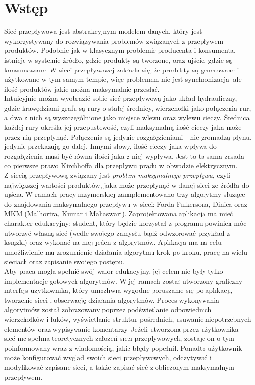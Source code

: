 \chapter{Wstęp}
Sieć przepływowa jest abstrakcyjnym modelem danych, który jest wykorzystywany do rozwiązywania problemów związanych z przepływem produktów. Podobnie jak w klasycznym problemie producenta i konsumenta, istnieje w systemie źródło, gdzie produkty są tworzone, oraz ujście, gdzie są konsumowane. W sieci przepływowej zakłada się, że produkty są generowane i użytkowane w tym samym tempie, więc problemem nie jest synchronizacja, ale ilość produktów jakie można maksymalnie przesłać.\\\indent
Intuicyjnie można wyobrazić sobie sieć przepływową jako układ hydrauliczny, gdzie krawędziami grafu są rury o stałej średnicy, wierzchołki jako połączenia rur, a dwa z nich są wyszczególnione jako miejsce wlewu oraz wylewu cieczy. Średnica każdej rury określa jej przepustowość, czyli maksymalną ilość cieczy jaka może przez nią przepłynąć. Połączenia są jedynie rozgałęzieniami - nie gromadzą płynu, jedynie przekazują go dalej. Innymi słowy, ilość cieczy jaka wpływa do rozgałęzienia musi być równa ilości jaka z niej wypływa. Jest to ta sama zasada co pierwsze prawo Kirchhoffa dla przepływu prądu w obwodzie elektrycznym.\\\indent
Z siecią przepływową związany jest \textit{problem maksymalnego przepływu}, czyli największej wartości produktów, jaka może przepłynąć w danej sieci ze źródła do ujścia. W ramach pracy inżynierskiej zaimplementowano trzy algorytmy służące do znajdowania maksymalnego przepływu w sieci: Forda-Fulkersona, Dinica oraz MKM (Malhortra, Kumar i Mahaswari). Zaprojektowana aplikacja ma mieć charakter edukacyjny: student, który będzie korzystał z programu powinien móc utworzyć własną sieć (wedle swojego zamysłu bądź odwzorować przykład z książki) oraz wykonać na niej jeden z algorytmów. Aplikacja ma na celu umożliwienie mu zrozumienie działania algorytmu krok po kroku, pracę na wielu sieciach oraz zapisanie swojego postępu.\\\indent
Aby praca mogła spełnić swój walor edukacyjny, jej celem nie były tylko implementacje gotowych algorytmów. W jej ramach został utworzony graficzny interfejs użytkownika, który umożliwia wygodne poruszanie się po aplikacji, tworzenie sieci i obserwację działania algorytmów. Proces wykonywania algorytmów został zobrazowany poprzez podświetlanie odpowiednich wierzchołków i łuków, wyświetlanie struktur pośrednich, usuwanie niepotrzebnych elementów oraz wypisywanie komentarzy. Jeżeli utworzona przez użytkownika sieć nie spełnia teoretycznych założeń sieci przepływowych, zostaje on o tym poinformowany wraz z wiadomością, jakie błędy popełnił. Ponadto użytkownik może konfigurować wygląd swoich sieci przepływowych, odczytywać i modyfikować zapisane sieci, a także zapisać sieć z obliczonym maksymalnym przepływem.\\\indent
